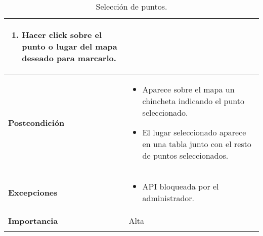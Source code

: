 \begin{longtable}[H]{@{}l|l@{}}
\begin{minipage}[t]{0.71\columnwidth}
			\begin{enumerate}
			\def\labelenumi{\arabic{enumi}.}
			\tightlist
			\item Hacer click sobre el punto o lugar del mapa deseado para marcarlo.
		\end{enumerate}
	\end{minipage}\tabularnewline
	\midrule
	\begin{minipage}[t]{0.23\columnwidth}\raggedright\strut
		\textbf{Postcondición}\strut
	\end{minipage} & \begin{minipage}[t]{0.71\columnwidth}\raggedright\strut
		\begin{itemize}
			\item Aparece sobre el mapa un chincheta indicando el punto seleccionado.
			\item El lugar seleccionado aparece en una tabla junto con el resto de puntos seleccionados.
		\end{itemize}
	\end{minipage}\tabularnewline
	\midrule
	\begin{minipage}[t]{0.23\columnwidth}\raggedright\strut
		\textbf{Excepciones}\strut
	\end{minipage} & \begin{minipage}[t]{0.71\columnwidth}\raggedright
		\begin{itemize}
			\tightlist
			\item API bloqueada por el administrador.
		\end{itemize}
	\end{minipage}\tabularnewline
	\midrule
	\begin{minipage}[t]{0.23\columnwidth}\raggedright\strut
		\textbf{Importancia}\strut
	\end{minipage} & \begin{minipage}[t]{0.71\columnwidth}\raggedright\strut
		Alta\strut
	\end{minipage}\tabularnewline
	\bottomrule
	\caption{Selección de puntos.}
	\label{cu:2.2}
\end{longtable}
\newpage

